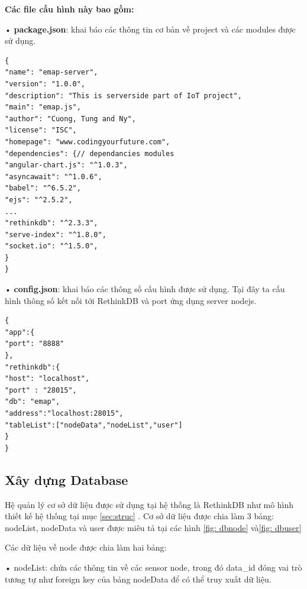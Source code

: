 \textbf{Các file cấu hình này bao gồm:}

• \textbf{package.json}: khai báo các thông tin cơ bản về project và các modules được sử dụng.
\begin{Verbatim}[xleftmargin=2em]
{
"name": "emap-server",
"version": "1.0.0",
"description": "This is serverside part of IoT project",
"main": "emap.js",
"author": "Cuong, Tung and Ny",
"license": "ISC",
"homepage": "www.codingyourfuture.com",
"dependencies": {// dependancies modules
"angular-chart.js": "^1.0.3",
"asyncawait": "^1.0.6",
"babel": "^6.5.2",
"ejs": "^2.5.2",
...
"rethinkdb": "^2.3.3",
"serve-index": "^1.8.0",
"socket.io": "^1.5.0",
}
}
\end{Verbatim}
• \textbf{config.json}: khai báo các thông số cấu hình được sử dụng. Tại đây ta cấu hình thông số kết nối tới RethinkDB và port ứng dụng server nodejs.
\begin{Verbatim}[xleftmargin=2em]
{
"app":{
"port": "8888"
},
"rethinkdb":{
"host": "localhost",
"port" : "28015",
"db": "emap",
"address":"localhost:28015",
"tableList":["nodeData","nodeList","user"]
}
}

\end{Verbatim}





\subsection{Xây dựng Database}
Hệ quản lý cơ sở dữ liệu được sử dụng tại hệ thống là RethinkDB như mô hình thiết kế hệ thống tại mục \ref{sec:struc} . Cơ sở dữ liệu được chia làm 3 bảng: nodeList, nodeData và user được miêu tả tại các hình \ref{fig: dbnode} và\ref{fig: dbuser}

Các dữ liệu về node được chia làm hai bảng:

• nodeList: chứa các thông tin về các sensor node, trong đó data\_id đóng vai trò tương tự như foreign key của bảng nodeData để có thể truy xuất dữ liệu.

